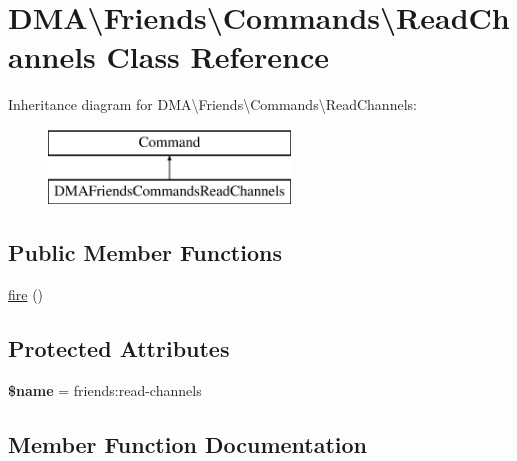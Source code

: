 \hypertarget{classDMA_1_1Friends_1_1Commands_1_1ReadChannels}{}\section{D\+M\+A\textbackslash{}Friends\textbackslash{}Commands\textbackslash{}Read\+Channels Class Reference}
\label{classDMA_1_1Friends_1_1Commands_1_1ReadChannels}
Inheritance diagram for D\+M\+A\textbackslash{}Friends\textbackslash{}Commands\textbackslash{}Read\+Channels\+:\begin{figure}[H]
\begin{center}
\leavevmode
\includegraphics[height=2.000000cm]{d6/d3d/classDMA_1_1Friends_1_1Commands_1_1ReadChannels}
\end{center}
\end{figure}
\subsection*{Public Member Functions}
\begin{DoxyCompactItemize}
\item 
\hyperlink{classDMA_1_1Friends_1_1Commands_1_1ReadChannels_a58b88a3a6874a74c05e11c028462e8a5}{fire} ()
\end{DoxyCompactItemize}
\subsection*{Protected Attributes}
\begin{DoxyCompactItemize}
\item 
\hypertarget{classDMA_1_1Friends_1_1Commands_1_1ReadChannels_a2d450c7a91b98117ea2a083ca28ea761}{}{\bfseries \$name} = \textquotesingle{}friends\+:read-\/channels\textquotesingle{}\label{classDMA_1_1Friends_1_1Commands_1_1ReadChannels_a2d450c7a91b98117ea2a083ca28ea761}

\end{DoxyCompactItemize}


\subsection{Member Function Documentation}
\hypertarget{classDMA_1_1Friends_1_1Commands_1_1ReadChannels_a58b88a3a6874a74c05e11c028462e8a5}{}
